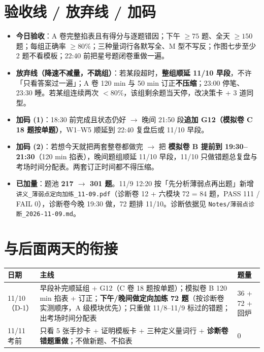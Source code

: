 \documentclass[11pt,a4paper]{ctexart}
\begin{document}
\section{验收线 / 放弃线 / 加码}
\begin{itemize}
\item \textbf{今日验收}：A 卷完整掐表且有得分与逐题错因；下午 $\geq 75$ 题、全天 $\geq 150$ 题；每组正确率 $\geq 80\%$；三种量词行各默写全、M 型不写反；作图七步至少 2 题不看模板；22:40 前把星号题闭卷重做一遍。
\item \textbf{放弃线（降速不减量，不跳组）}：若某段超时，\textbf{整组顺延 11/10 早段}，不许「只看答案过一遍」；A 卷 120 min 与 50 min 订正\textbf{不压缩}；23:00 停笔、23:30 睡。若某组连续两次 $<80\%$，该组剩余题当天停，改决策卡 + 3 道同型。
\item \textbf{加码 (1)}：18:30 前完成且状态仍好 $\to$ 晚间 21:50 段\textbf{追加 G12（模拟卷 C 18 题按单题）}，W1--W5 顺延到 22:40 复盘后或 11/10 早段。
\item \textbf{加码 (2)}：若想今天就把两套整卷都做完 $\to$ 把 \textbf{模拟卷 B 提前到 19:30--21:30}（120 min 掐表），晚间题组顺延 11/10 早段，11/10 只做错题总复盘与考场时间分配表。两套订正时间都不得压缩。
\item \textbf{已加量}：题池 \textbf{217 $\to$ 301 题}。11/9 12:20 按「先分析薄弱点再出题」新增 \texttt{讲义\_薄弱点定向加练\_11-09.pdf}（诊断卷 12 + 六模块 72 = 84 题，PASS 111 / FAIL 0），诊断卷今晚 19:30 做，72 题排 11/10。诊断依据见 \texttt{Notes/薄弱点诊断\_2026-11-09.md}。
\end{itemize}

\section{与后面两天的衔接}
\begin{center}
{\small
\begin{tabular}{@{}p{2.0cm}p{10.6cm}p{2.8cm}@{}}
\toprule
\textbf{日期} & \textbf{主线} & \textbf{题量} \\
\midrule
11/10（D-1） & 早段补完顺延组 + G12（C 卷 18 题按单题）；模拟卷 B 120 min 掐表 + 订正；\textbf{下午/晚间做定向加练 72 题}（按诊断卷实测顺序，A 级模块优先）；只重做 11/8--11/9 标过的错题；出考场时间分配表 & 36 + 72 + 回炉 \\
11/11 考前 & 只看 5 张手抄卡 + 证明模板卡 + 三种定义量词行 + \textbf{诊断卷错题重做}；不做新题、不掐表 & 0 \\
\bottomrule
\end{tabular}
}
\end{center}

\vspace{0.3em}
\end{document}
